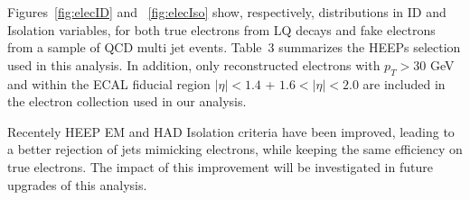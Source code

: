 Figures~\ref{fig:elecID} and ~\ref{fig:elecIso} show, respectively, distributions in ID and Isolation variables, 
for both true electrons from LQ decays and fake electrons from a sample of QCD multi jet events. 
Table~3
summarizes the HEEPs selection used in this analysis. In addition, only reconstructed electrons with 
$p_{T}>30$ GeV and 
within the ECAL fiducial region 
$|\eta|<1.4$ + $1.6<|\eta|<2.0$ are included in the electron collection used in our analysis.  

Recentely HEEP EM and HAD Isolation criteria have been improved, 
leading to a better rejection of jets mimicking electrons, while keeping the same efficiency on true electrons.
The impact of this improvement will be investigated in 
future upgrades of this analysis. 


 



